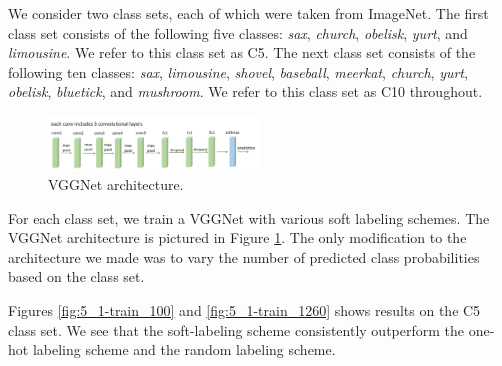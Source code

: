 

We consider two class sets, each of which were taken from ImageNet. The first
class set consists of the following five classes:
\emph{sax},
\emph{church},
\emph{obelisk},
\emph{yurt}, and
\emph{limousine}.
We refer to this class set as C5.
The next class set consists of the following ten classes:
\emph{sax},
\emph{limousine},
\emph{shovel},
\emph{baseball},
\emph{meerkat},
\emph{church},
\emph{yurt},
\emph{obelisk},
\emph{bluetick}, and
\emph{mushroom}.
We refer to this class set as C10 throughout.

\begin{figure}[!tb]
  \centering
  \includegraphics[width=0.5\textwidth]{figs/vgg16arch.png}
  \caption{
      VGGNet architecture.
  }
  \label{fig:vgg16arch}
\end{figure}

For each class set, we train a VGGNet with various soft labeling schemes. The
VGGNet architecture is pictured in Figure \ref{fig:vgg16arch}. The only
modification to the architecture we made was to vary the number of
predicted class probabilities based on the class set.

Figures \ref{fig:5_1-train_100} and \ref{fig:5_1-train_1260} shows results on
the C5 class set. We see that the soft-labeling scheme consistently outperform
the one-hot labeling scheme and the random labeling scheme. 

